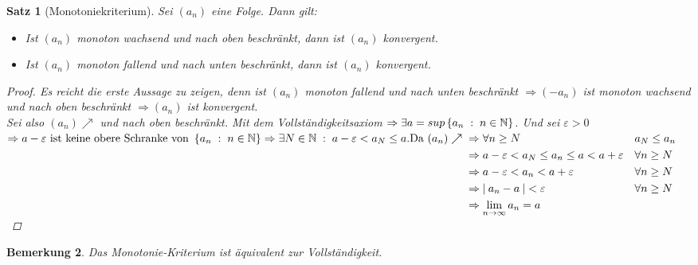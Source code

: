 \documentclass[a4paper,titlepage,oneside]{article}
\def\N{\ensuremath{\mathbb{N}} }
\renewcommand{\epsilon}{\ensuremath{\varepsilon} }
\def\sp{\hspace{0,1cm}}
\def\spcolon{\sp:\sp}
\renewcommand{\liminf}[2][n]{\ensuremath{\lim\limits_{#1 \rightarrow \infty}{#2}}}
\newcommand{\abs}[1]{\ensuremath{\left|\:#1\:\right|}}
\newcommand{\menge}[2]{\ensuremath{\left\{#1\sp : \sp #2\right\}}}
\theoremstyle{thmstyle}
\newtheorem{satz}{Satz}[section]
\newtheorem{bem}[satz]{Bemerkung}
\theoremstyle{subthmstyle}
\begin{document}
\begin{satz}[Monotoniekriterium]
Sei $(a_n)$ eine Folge. Dann gilt:
\begin{itemize}
\item Ist $(a_n)$ monoton wachsend und nach oben beschränkt, dann ist $(a_n)$ konvergent.
\item Ist $(a_n)$ monoton fallend  und nach unten beschränkt, dann ist $(a_n)$ konvergent.
\end{itemize}
\begin{proof}
Es reicht die erste Aussage zu zeigen, denn ist $(a_n)$ monoton fallend und nach unten beschränkt \( \Rightarrow (-a_n)\) ist monoton wachsend und nach oben beschränkt $\Rightarrow (a_n) $ ist konvergent.\\
Sei also \((a_n) \nearrow \) und nach oben beschränkt. Mit dem Vollständigkeitsaxiom \(\Rightarrow \exists a = sup\menge{a_n}{n \in \N}\). Und sei $\epsilon > 0$
\begin{math}
\Rightarrow a - \epsilon \text{ ist keine obere Schranke von } \menge{a_n}{n \in \N} \Rightarrow \exists N \in \N \spcolon a-\epsilon < a_N \le a.\\
\text{Da }(a_n) \nearrow \begin{aligned}[t]
					&\Rightarrow \forall n \ge N 						&& a_N \le a_n \\
					&\Rightarrow a-\epsilon < a_N \le a_n \le a < a+\epsilon 	&& \forall n \ge N \\
					&\Rightarrow a-\epsilon < a_n < a+\epsilon 			&& \forall n \ge N \\
					&\Rightarrow \abs{a_n - a} < \epsilon					&& \forall n \ge N \\
					&\Rightarrow \liminf{a_n} = a \end{aligned}\end{math}\\
\end{proof}
\end{satz}

\begin{bem}
Das Monotonie-Kriterium ist äquivalent zur Vollständigkeit.
\end{bem}
\end{document}
